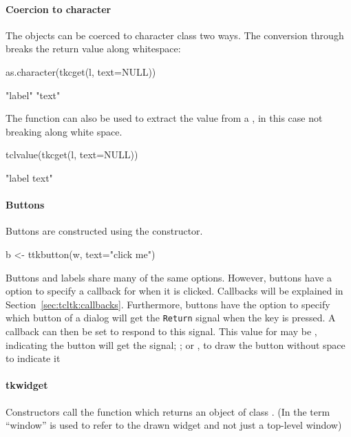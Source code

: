 \paragraph{Coercion to character}
The  objects can be coerced to character class two ways.
The conversion through  breaks the return value along whitespace:
\begin{Schunk}
\begin{Sinput}
 as.character(tkcget(l, text=NULL))
\end{Sinput}
\begin{Soutput}
[1] "label" "text" 
\end{Soutput}
\end{Schunk}
The  function can also be used to extract the value from a , in this case not breaking along white space.
\begin{Schunk}
\begin{Sinput}
 tclvalue(tkcget(l, text=NULL))
\end{Sinput}
\begin{Soutput}
[1] "label text"
\end{Soutput}
\end{Schunk}



\paragraph{Buttons}
Buttons are constructed using the  constructor.
\begin{Schunk}
\begin{Sinput}
 b <- ttkbutton(w, text="click me")
\end{Sinput}
\end{Schunk}

Buttons and labels share many of the same options. However, buttons
have a option to specify a callback for
when it is clicked. Callbacks will be explained in
Section~\ref{sec:tcltk:callbacks}.  Furthermore, buttons have the
option  to specify which button of a
dialog will get the \texttt{Return} signal when the  key is
pressed. A callback can then be set to respond to this signal. This
value for  may be , indicating the button
will get the signal; ; or , to draw the
button without space to indicate it


\paragraph{tkwidget}
Constructors call the  function which returns an
object of class . (In \TK\/ the term ``window'' is used to
refer to the drawn widget and not just a top-level window)

